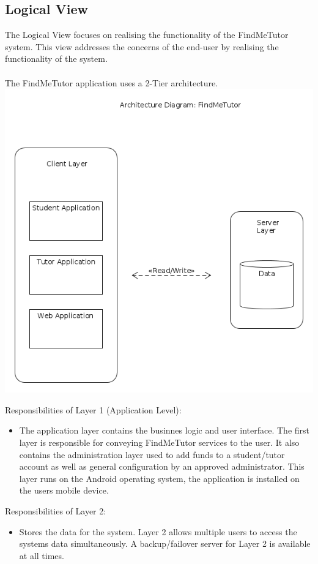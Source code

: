 \documentclass[12pt]{article}
\begin{document}
\pagebreak
\subsection{Logical View}
The Logical View focuses on realising the functionality of the FindMeTutor system. This view addresses the concerns of the end-user by realising the functionality of the system.\\\\
The FindMeTutor application uses a 2-Tier architecture.\\
\includegraphics[width=140mm]{./architecture_diagram.png}

Responsibilities of Layer 1 (Application Level):
\begin{itemize}
\item The application layer contains the businnes logic and user interface. The first layer is responsible for conveying FindMeTutor services to the user. It also contains the administration layer used to add funds to a student/tutor account as well as general configuration by an approved administrator. This layer runs on the Android operating system, the application is installed on the users mobile device.
\end{itemize}

Responsibilities of Layer 2:
\begin{itemize}
\item Stores the data for the system. Layer 2 allows multiple users to access the systems data simultaneously. A backup/failover server for Layer 2 is available at all times.
\end{itemize}
\newpage
\end{document}
